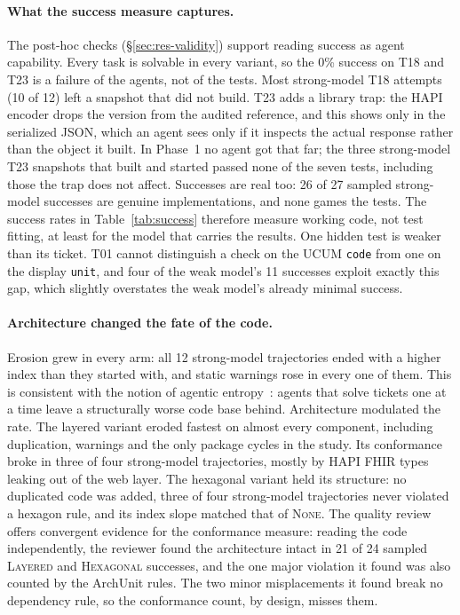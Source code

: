 \documentclass[10pt]{article}
\newcommand{\NONE}{\textsc{None}}
\newcommand{\LAY}{\textsc{Layered}}
\newcommand{\HEX}{\textsc{Hexagonal}}
\newcommand{\code}[1]{\texttt{#1}}
\begin{document}
\paragraph{What the success measure captures.} The post-hoc checks (\S\ref{sec:res-validity})
support reading success as agent capability. Every task is solvable in every variant, so the 0\%
success on T18 and T23 is a failure of the agents, not of the tests. Most strong-model T18 attempts
(10 of 12) left a snapshot that did not build. T23 adds a library trap: the HAPI encoder drops the
version from the audited reference, and this shows only in the serialized JSON, which an agent sees
only if it inspects the actual response rather than the object it built. In Phase~1 no agent got
that far; the three strong-model T23 snapshots that built and started passed none of the seven
tests, including those the trap does not affect. Successes are real too: 26 of 27 sampled
strong-model successes are genuine implementations, and none games the tests. The success rates in
Table~\ref{tab:success} therefore measure working code, not test fitting, at least for the model
that carries the results. One hidden test is weaker than its ticket. T01 cannot distinguish a check
on the UCUM \code{code} from one on the display \code{unit}, and four of the weak model's 11
successes exploit exactly this gap, which slightly overstates the weak model's already minimal
success.

\paragraph{Architecture changed the fate of the code.} Erosion grew in every arm: all 12
strong-model trajectories ended with a higher index than they started with, and static warnings
rose in every one of them. This is consistent with the notion of agentic
entropy~\citep{agenticentropy2026}: agents that solve tickets one at a time leave a structurally
worse code base behind. Architecture modulated the rate. The layered variant eroded fastest on
almost every component, including duplication, warnings and the only package cycles in the study.
Its conformance broke in three of four strong-model trajectories, mostly by HAPI FHIR types leaking
out of the web layer. The hexagonal variant held its structure: no duplicated code was added, three
of four strong-model trajectories never violated a hexagon rule, and its index slope matched that
of \NONE. The quality review offers convergent evidence for the conformance measure: reading the code
independently, the reviewer found the architecture intact in 21 of 24 sampled \LAY{} and \HEX{}
successes, and the one major violation it found was also counted by the ArchUnit rules. The two minor
misplacements it found break no dependency rule, so the conformance count, by design, misses them.
\end{document}
